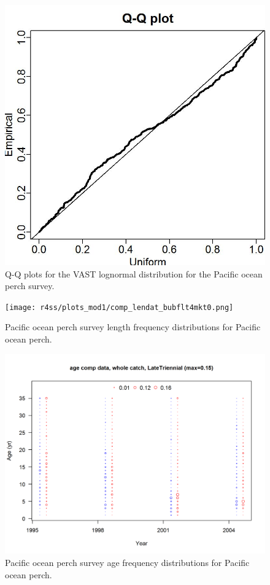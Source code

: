 \documentclass[12pt,]{article}
\begin{document}
\begin{figure}
\centering
\includegraphics{Figures/Q-Q_plot_pop.jpg}
\caption{Q-Q plots for the VAST lognormal distribution for the Pacific
ocean perch survey. \label{fig:pop_qq}}
\end{figure}

\FloatBarrier

\begin{figure}
\centering
\texttt{[image: r4ss/plots\_mod1/comp\_lendat\_bubflt4mkt0.png]}
\caption{Pacific ocean perch survey length frequency distributions for
Pacific ocean perch. \label{fig:POP_Length}}
\end{figure}

\FloatBarrier

\begin{figure}
\centering
\includegraphics{r4ss/plots_mod1/comp_agedat_bubflt4mkt0.png}
\caption{Pacific ocean perch survey age frequency distributions for
Pacific ocean perch. \label{fig:POP_Age}}
\end{figure}
\end{document}
